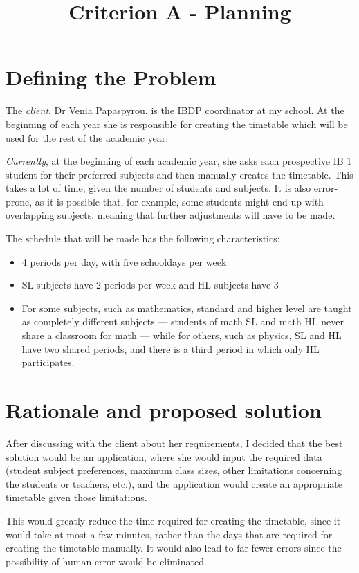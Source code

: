 \documentclass[a4paper, 12pt]{article}
\title{Criterion A - Planning}
\date{}
\begin{document}
\maketitle

\section{Defining the Problem}

The \emph{client}, Dr Venia Papaspyrou, is the IBDP coordinator at my school. At the
beginning of each year she is responsible for creating the timetable which will be used for
the rest of the academic year. 

\emph{Currently}, at the beginning of each academic year, she asks each prospective IB 1
student for their preferred subjects and then manually creates the timetable. This takes a
lot of time, given the number of students and subjects. It is also error-prone, as it is
possible that, for example, some students might end up with overlapping subjects, meaning
that further adjustments will have to be made. 

The schedule that will be made has the following characteristics:
%
\begin{itemize}
    \item 4 periods per day, with five schooldays per week
    \item SL subjects have 2 periods per week and HL subjects have 3
    \item For some subjects, such as mathematics, standard and higher level are taught as
        completely different subjects --- students of math SL and math HL never share a
        classroom for math --- while for others, such as physics, SL and HL have two shared
        periods, and there is a third period in which only HL participates. 
\end{itemize}
%

\section{Rationale and proposed solution}

After discussing with the client about her requirements, I decided that the best solution
would be an application, where she would input the required data (student subject
preferences, maximum class sizes, other limitations concerning the students or teachers,
etc.), and the application would create an appropriate timetable given those limitations. 

This would greatly reduce the time required for creating the timetable, since it would take
at most a few minutes, rather than the days that are required for creating the timetable
manually. It would also lead to far fewer errors since the possibility of human error would
be eliminated. 
\end{document}
